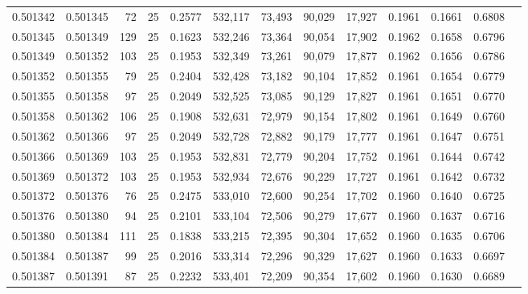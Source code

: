 \begin{tabular}{rrrrrrrrrrrrr}
0.501342 & 0.501345 &  72 &  25 &                                     0.2577 & 532,117 &  73,493 &  90,029 &  17,927 & 0.1961 & 0.1661 & 0.6808 \\
0.501345 & 0.501349 & 129 &  25 &                                     0.1623 & 532,246 &  73,364 &  90,054 &  17,902 & 0.1962 & 0.1658 & 0.6796 \\
0.501349 & 0.501352 & 103 &  25 &                                     0.1953 & 532,349 &  73,261 &  90,079 &  17,877 & 0.1962 & 0.1656 & 0.6786 \\
0.501352 & 0.501355 &  79 &  25 &                                     0.2404 & 532,428 &  73,182 &  90,104 &  17,852 & 0.1961 & 0.1654 & 0.6779 \\
0.501355 & 0.501358 &  97 &  25 &                                     0.2049 & 532,525 &  73,085 &  90,129 &  17,827 & 0.1961 & 0.1651 & 0.6770 \\
0.501358 & 0.501362 & 106 &  25 &                                     0.1908 & 532,631 &  72,979 &  90,154 &  17,802 & 0.1961 & 0.1649 & 0.6760 \\
0.501362 & 0.501366 &  97 &  25 &                                     0.2049 & 532,728 &  72,882 &  90,179 &  17,777 & 0.1961 & 0.1647 & 0.6751 \\
0.501366 & 0.501369 & 103 &  25 &                                     0.1953 & 532,831 &  72,779 &  90,204 &  17,752 & 0.1961 & 0.1644 & 0.6742 \\
0.501369 & 0.501372 & 103 &  25 &                                     0.1953 & 532,934 &  72,676 &  90,229 &  17,727 & 0.1961 & 0.1642 & 0.6732 \\
0.501372 & 0.501376 &  76 &  25 &                                     0.2475 & 533,010 &  72,600 &  90,254 &  17,702 & 0.1960 & 0.1640 & 0.6725 \\
0.501376 & 0.501380 &  94 &  25 &                                     0.2101 & 533,104 &  72,506 &  90,279 &  17,677 & 0.1960 & 0.1637 & 0.6716 \\
0.501380 & 0.501384 & 111 &  25 &                                     0.1838 & 533,215 &  72,395 &  90,304 &  17,652 & 0.1960 & 0.1635 & 0.6706 \\
0.501384 & 0.501387 &  99 &  25 &                                     0.2016 & 533,314 &  72,296 &  90,329 &  17,627 & 0.1960 & 0.1633 & 0.6697 \\
0.501387 & 0.501391 &  87 &  25 &                                     0.2232 & 533,401 &  72,209 &  90,354 &  17,602 & 0.1960 & 0.1630 & 0.6689 \\

\end{tabular}
